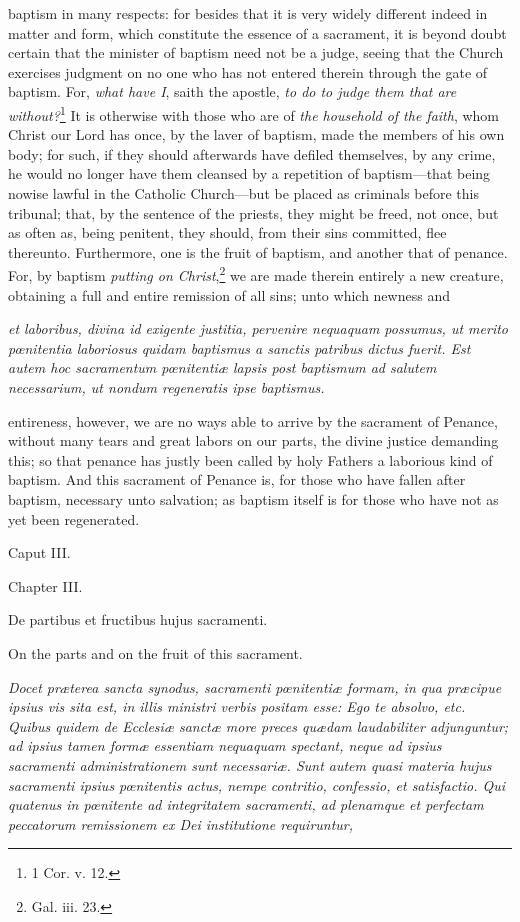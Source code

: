 baptism in many respects: for besides that it is very widely different indeed in matter and form, which constitute the essence of a sacrament, it is beyond doubt certain that the minister of baptism need not be a judge, seeing that the Church exercises judgment on no one who has not entered therein through the gate of baptism. For, \emph{what have I}, saith the apostle, \emph{to do to judge them that are without?}\footnote{\par   1 Cor. v. 12.} It is otherwise with those who are of \emph{the household of the faith}, whom Christ our Lord has once, by the laver of baptism, made the members of his own body; for such, if they should afterwards have defiled themselves, by any crime, he would no longer have them cleansed by a repetition of baptism—that being nowise lawful in the Catholic Church—but be placed as criminals before this tribunal; that, by the sentence of the priests, they might be freed, not once, but as often as, being penitent, they should, from their sins committed, flee thereunto. Furthermore, one is the fruit of baptism, and another that of penance. For, by baptism \emph{putting on Christ},\footnote{\par   Gal. iii. 23.} we are made therein entirely a new creature, obtaining a full and entire remission of all sins; unto which newness and

\emph{et laboribus, divina id exigente justitia, pervenire nequaquam possumus, ut merito pœnitentia laboriosus quidam baptismus a sanctis patribus dictus fuerit. Est autem hoc sacramentum pœnitentiæ lapsis post baptismum ad salutem necessarium, ut nondum regeneratis ipse baptismus.}

entireness, however, we are no ways able to arrive by the sacrament of Penance, without many tears and great labors on our parts, the divine justice demanding this; so that penance has justly been called by holy Fathers a laborious kind of baptism. And this sacrament of Penance is, for those who have fallen after baptism, necessary unto salvation; as baptism itself is for those who have not as yet been regenerated.

Caput III.

Chapter III.

De partibus et fructibus hujus sacramenti.

On the parts and on the fruit of this sacrament.

\emph{Docet præterea sancta synodus, sacramenti pœnitentiæ formam, in qua præcipue ipsius vis sita est, in illis ministri verbis positam esse: Ego te absolvo, etc. Quibus quidem de Ecclesiæ sanctæ more preces quædam laudabiliter adjunguntur; ad ipsius tamen formæ essentiam nequaquam spectant, neque ad ipsius sacramenti administrationem sunt necessariæ. Sunt autem quasi materia hujus sacramenti ipsius pœnitentis actus, nempe contritio, confessio, et satisfactio. Qui quatenus in pœnitente ad integritatem sacramenti, ad plenamque et perfectam peccatorum remissionem ex Dei institutione requiruntur, }

